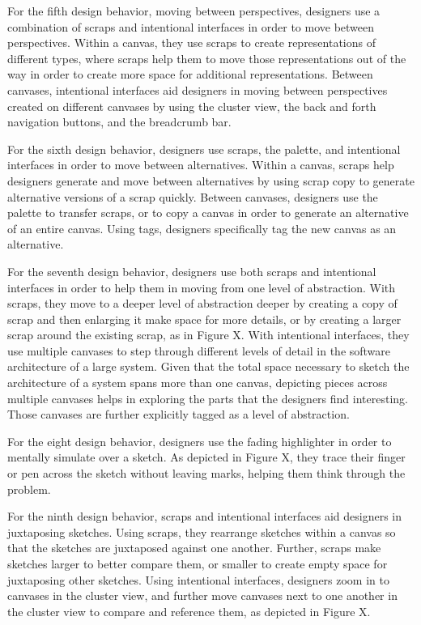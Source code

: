 For the fifth design behavior, moving between perspectives, designers use a combination of scraps and intentional interfaces in order to move between perspectives. Within a canvas, they use scraps to create representations of different types, where scraps help them to move those representations out of the way in order to create more space for additional representations. Between canvases, intentional interfaces aid designers in moving between perspectives created on different canvases by using the cluster view, the back and forth navigation buttons, and the breadcrumb bar.

For the sixth design behavior, designers use scraps, the palette, and intentional interfaces in order to move between alternatives. Within a canvas, scraps help designers generate and move between alternatives by using scrap copy to generate alternative versions of a scrap quickly. Between canvases, designers use the palette to transfer scraps, or to copy a canvas in order to generate an alternative of an entire canvas. Using tags, designers specifically tag the new canvas as an alternative.

For the seventh design behavior, designers use both scraps and intentional interfaces in order to help them in moving from one level of abstraction. With scraps, they move to a deeper level of abstraction deeper by creating a copy of scrap and then enlarging it make space for more details, or by creating a larger scrap around the existing scrap, as in Figure X. With intentional interfaces, they use multiple canvases to step through different levels of detail in the software architecture of a large system. Given that the total space necessary to sketch the architecture of a system spans more than one canvas, depicting pieces across multiple canvases helps in exploring the parts that the designers find interesting. Those canvases are further explicitly tagged as a level of abstraction.

For the eight design behavior, designers use the fading highlighter in order to mentally simulate over a sketch. As depicted in Figure X, they trace their finger or pen across the sketch without leaving marks, helping them think through the problem.

For the ninth design behavior, scraps and intentional interfaces aid designers in juxtaposing sketches. Using scraps, they rearrange sketches within a canvas so that the sketches are juxtaposed against one another. Further, scraps make sketches larger to better compare them, or smaller to create empty space for juxtaposing other sketches. Using intentional interfaces, designers zoom in to canvases in the cluster view, and further move canvases next to one another in the cluster view to compare and reference them, as depicted in Figure X.

